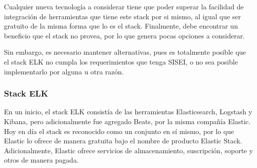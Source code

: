 Cualquier nueva tecnología a considerar tiene que poder superar la facilidad de integración de herramientas que tiene este stack por si mismo, al igual que ser gratuito de la misma forma que lo es el stack. Finalmente, debe encontrar un beneficio que el stack no provea, por lo que genera pocas opciones a considerar.

Sin embargo, es necesario mantener alternativas, pues es totalmente posible que el stack ELK no cumpla los requerimientos que tenga SISEI, o no sea posible implementarlo por alguna u otra razón.

\subsubsection{Stack ELK}

En un inicio, el stack ELK consistía de las herramientas Elasticsearch, Logstash y Kibana, pero adicionalmente fue agregado Beats, por la misma compañía Elastic. Hoy en día el stack es reconocido como un conjunto en sí mismo, por lo que Elastic lo ofrece de manera gratuita bajo el nombre de producto Elastic Stack. Adicionalmente, Elastic ofrece servicios de almacenamiento, suscripción, soporte y otros de manera pagada.

